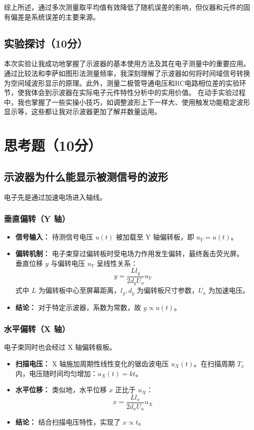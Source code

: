 \documentclass[]{../template/Report}%
\begin{document}
综上所述，通过多次测量取平均值有效降低了随机误差的影响，但仪器和元件的固有偏差是系统误差的主要来源。

\subsection{实验探讨（10分）}

本次实验让我成功地掌握了示波器的基本使用方法及其在电子测量中的重要应用。通过比较法和李萨如图形法测量频率，我深刻理解了示波器如何将时间域信号转换为空间域波形显示的原理。此外，测量二极管导通电压和RC电路相位差的实验环节，使我体会到示波器在实际电子元件特性分析中的实用价值。
在动手实验过程中，我也掌握了一些实操小技巧，如调整波形上下一样大、使用触发功能稳定波形显示等，这些都让我对示波器更加了解并数量运用。
\section{思考题（10分）}

\subsection{示波器为什么能显示被测信号的波形}
电子先是通过加速电场进入轴线。
\subsubsection{垂直偏转（Y 轴）}
\begin{itemize}
    \item \textbf{信号输入：} 待测信号电压 $u(t)$ 被加载至 Y 轴偏转板，即 $u_Y = u(t)$。
    \item \textbf{偏转机制：} 电子束穿过偏转板时受电场力作用发生偏转，最终轰击荧光屏。垂直位移 $y$ 与偏转电压 $u_Y$ 呈线性关系：
    \[ y = \frac{L l_y}{2 d_y U_a} u_Y \]
    式中 $L$ 为偏转板中心至屏幕距离，$l_y, d_y$ 为偏转板尺寸参数，$U_a$ 为加速电压。
    \item \textbf{结论：} 对于特定示波器，系数为常数，故 $y \propto u(t)$。
\end{itemize}

\subsubsection{水平偏转（X 轴）}

电子束同时也会经过 X 轴偏转极板。

\begin{itemize}
    \item \textbf{扫描电压：} X 轴施加周期性线性变化的锯齿波电压 $u_X(t)$。在扫描周期 $T_x$ 内，电压随时间均匀增加：$u_X(t) = k t$。
    \item \textbf{水平位移：} 类似地，水平位移 $x$ 正比于 $u_X$：
    \[ x = \frac{L l_x}{2 d_x U_a} u_X \]
    \item \textbf{结论：} 结合扫描电压特性，实现了 $x \propto t$。
\end{itemize}
\end{document}
